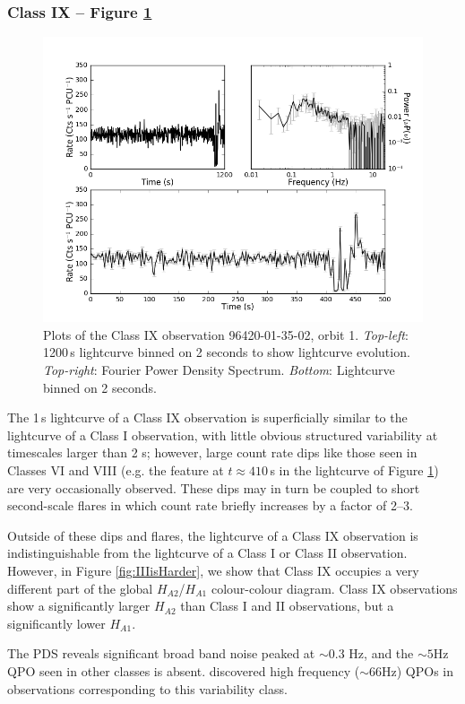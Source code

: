 \subsubsection{Class IX -- Figure \ref{fig:Qmulti}}
\label{sec:ClassIX}
\begin{figure}
    \includegraphics[width=0.8\columnwidth, trim = 0.6cm 0 3.9cm 0]{images/Qmulti.png}
    \captionsetup{singlelinecheck=off}
    \caption{Plots of the Class IX observation 96420-01-35-02, orbit 1.  \textit{Top-left}: 1200\,s lightcurve binned on 2 seconds to show lightcurve evolution.  \textit{Top-right}: Fourier Power Density Spectrum.  \textit{Bottom}: Lightcurve binned on 2 seconds.}
   \label{fig:Qmulti}
\end{figure}

\par The 1\,s lightcurve of a Class IX observation is superficially similar to the lightcurve of a Class I observation, with little obvious structured variability at timescales larger than 2 s; however, large count rate dips like those seen in Classes VI and VIII (e.g. the feature at $t\approx410$\,s in the lightcurve of Figure \ref{fig:Qmulti}) are very occasionally observed.  These dips may in turn be coupled to short second-scale flares in which count rate briefly increases by a factor of 2--3.
\par Outside of these dips and flares, the lightcurve of a Class IX observation is indistinguishable from the lightcurve of a Class I or Class II observation.  However, in Figure \ref{fig:IIIisHarder}, we show that Class IX occupies a very different part of the global $H_{A2}$/$H_{A1}$ colour-colour diagram.  Class IX observations show a significantly larger $H_{A2}$ than Class I and II observations, but a significantly lower $H_{A1}$.
\par The PDS reveals significant broad band noise peaked at $\sim$0.3 Hz, and the $\sim5$Hz QPO seen in other classes is absent.  \citet{Altamirano_HFQPO} discovered high frequency ($\sim66$Hz) QPOs in observations corresponding to this variability class.

